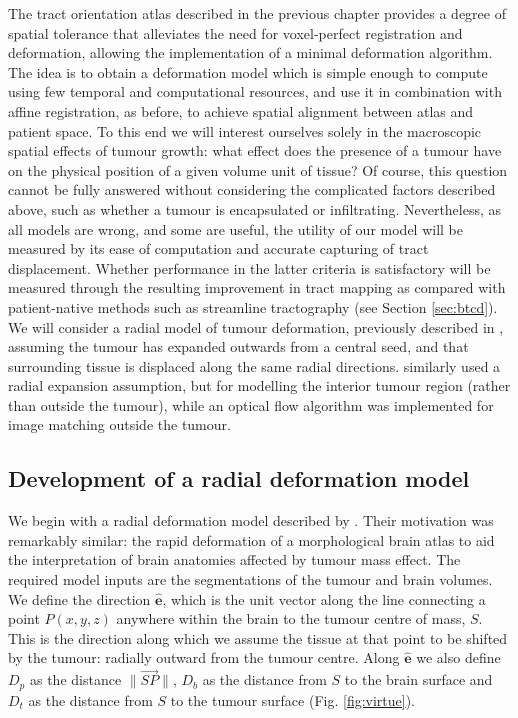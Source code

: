 The tract orientation atlas described in the previous chapter provides a degree of spatial tolerance that alleviates the need for voxel-perfect registration and deformation, allowing the implementation of a minimal deformation algorithm.
The idea is to obtain a deformation model which is simple enough to compute using few temporal and computational resources, and use it in combination with affine registration, as before, to achieve spatial alignment between atlas and patient space.
To this end we will interest ourselves solely in the macroscopic spatial effects of tumour growth: what effect does the presence of a tumour have on the physical position of a given volume unit of tissue? 
Of course, this question cannot be fully answered without considering the complicated factors described above, such as whether a tumour is encapsulated or infiltrating.
Nevertheless, as all models are wrong, and some are useful, the utility of our model will be measured by its ease of computation and accurate capturing of tract displacement.
Whether performance in the latter criteria is satisfactory will be measured through the resulting improvement in tract mapping as compared with patient-native methods such as streamline tractography (see Section \ref{sec:btcd}).
We will consider a radial model of tumour deformation, previously described in \textcite{Young2022}, assuming the tumour has expanded outwards from a central seed, and that surrounding tissue is displaced along the same radial directions.
\textcite{Cuadra2004} similarly used a radial expansion assumption, but for modelling the interior tumour region (rather than outside the tumour), while an optical flow algorithm was implemented for image matching outside the tumour.


\subsection{Development of a radial deformation model}

We begin with a radial deformation model described by \textcite{Nowinski2005}.
Their motivation was remarkably similar: the rapid deformation of a morphological brain atlas to aid the interpretation of brain anatomies affected by tumour mass effect.
The required model inputs are the segmentations of the tumour and brain volumes.
We define the direction $\mathbf{\hat{e}}$, which is the unit vector along the line connecting a point $P(x,y,z)$ anywhere within the brain to the tumour centre of mass, $S$.
This is the direction along which we assume the tissue at that point to be shifted by the tumour: radially outward from the tumour centre.
Along $\mathbf{\hat{e}}$ we also define $D_p$ as the distance  $\|\overrightarrow{SP}\|$, $D_b$ as the distance from $S$ to the brain surface and $D_t$ as the distance from $S$ to the tumour surface (Fig. \ref{fig:virtue}).

